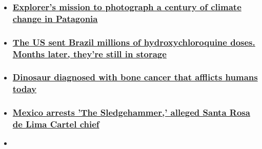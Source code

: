 \begin{itemize}
\item
  \hypertarget{explorers-mission-to-photograph-a-century-of-climate-change-in-patagonia}{%
  \subsubsection{\texorpdfstring{\href{/2020/08/04/americas/cristian-donoso-patagonia-climate-change-spc-c2e-intl-scn/index.html}{Explorer's
  mission to photograph a century of climate change in
  Patagonia}}{Explorer's mission to photograph a century of climate change in Patagonia}}\label{explorers-mission-to-photograph-a-century-of-climate-change-in-patagonia}}
\item
  \hypertarget{the-us-sent-brazil-millions-of-hydroxychloroquine-doses-months-later-theyre-still-in-storage}{%
  \subsubsection{\texorpdfstring{\href{/2020/08/04/americas/brazil-us-hydroxychloroquine-doses-intl/index.html}{The
  US sent Brazil millions of hydroxychloroquine doses. Months later,
  they're still in
  storage}}{The US sent Brazil millions of hydroxychloroquine doses. Months later, they're still in storage}}\label{the-us-sent-brazil-millions-of-hydroxychloroquine-doses-months-later-theyre-still-in-storage}}
\item
  \hypertarget{dinosaur-diagnosed-with-bone-cancer-that-afflicts-humans-today}{%
  \subsubsection{\texorpdfstring{\href{/2020/08/03/americas/dinosaur-fossil-cancer-first-scn/index.html}{Dinosaur
  diagnosed with bone cancer that afflicts humans
  today}}{Dinosaur diagnosed with bone cancer that afflicts humans today}}\label{dinosaur-diagnosed-with-bone-cancer-that-afflicts-humans-today}}
\item
  \hypertarget{mexico-arrests-the-sledgehammer-alleged-santa-rosa-de-lima-cartel-chief}{%
  \subsubsection{\texorpdfstring{\href{/2020/08/02/americas/mexico-cartel-el-marro-arrest/index.html}{Mexico
  arrests 'The Sledgehammer,' alleged Santa Rosa de Lima Cartel
  chief}}{Mexico arrests 'The Sledgehammer,' alleged Santa Rosa de Lima Cartel chief}}\label{mexico-arrests-the-sledgehammer-alleged-santa-rosa-de-lima-cartel-chief}}
\item
  \hypertarget{what-happens-in-august-could-be-key-in-latin-americas-coronavirus-fight-expert-says}{%
}
\end{itemize}
